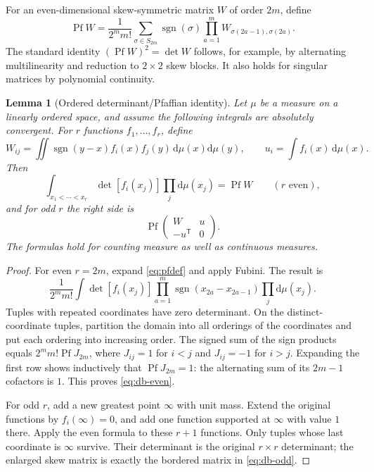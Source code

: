 \documentclass[11pt]{article}
\numberwithin{equation}{section}
\newtheorem{lemma}[lemma]{Lemma}
\theoremstyle{definition}
\newcommand{\dd}{\mathrm{d}}
\newcommand{\Pf}{\operatorname{Pf}}
\newcommand{\sgn}{\operatorname{sgn}}
\begin{document}
For an even-dimensional skew-symmetric matrix $W$ of order $2m$, define
\begin{equation}\label{eq:pfdef}
 \Pf W=\frac1{2^m m!}\sum_{\sigma\in S_{2m}}\sgn(\sigma)
       \prod_{a=1}^{m}W_{\sigma(2a-1),\sigma(2a)}.
\end{equation}
The standard identity $(\Pf W)^2=\det W$ follows, for example, by alternating multilinearity and reduction to $2\times2$ skew blocks. It also holds for singular matrices by polynomial continuity.

\begin{lemma}[Ordered determinant/Pfaffian identity]\label{lem:debruijn}
Let $\mu$ be a measure on a linearly ordered space, and assume the following integrals are absolutely convergent. For $r$ functions $f_1,\ldots,f_r$, define
\[
 W_{ij}=\iint\sgn(y-x)f_i(x)f_j(y)\,\dd\mu(x)\dd\mu(y),
 \qquad u_i=\int f_i(x)\,\dd\mu(x).
\]
Then
\begin{equation}\label{eq:db-even}
 \int_{x_1<\cdots<x_r}\det[f_i(x_j)]\prod_j\dd\mu(x_j)
 =\Pf W\qquad(r\text{ even}),
\end{equation}
and for odd $r$ the right side is
\begin{equation}\label{eq:db-odd}
 \Pf\begin{pmatrix}W&u\\-u^{\mathsf T}&0\end{pmatrix}.
\end{equation}
The formulas hold for counting measure as well as continuous measures.
\end{lemma}

\begin{proof}
For even $r=2m$, expand \eqref{eq:pfdef} and apply Fubini. The result is
\[
 \frac1{2^m m!}\int\det[f_i(x_j)]
 \prod_{a=1}^m\sgn(x_{2a}-x_{2a-1})\prod_j\dd\mu(x_j).
\]
Tuples with repeated coordinates have zero determinant. On the distinct-coordinate tuples, partition the domain into all orderings of the coordinates and put each ordering into increasing order. The signed sum of the sign products equals $2^m m!\Pf J_{2m}$, where $J_{ij}=1$ for $i<j$ and $J_{ij}=-1$ for $i>j$. Expanding the first row shows inductively that $\Pf J_{2m}=1$: the alternating sum of its $2m-1$ cofactors is $1$. This proves \eqref{eq:db-even}.

For odd $r$, add a new greatest point $\infty$ with unit mass. Extend the original functions by $f_i(\infty)=0$, and add one function supported at $\infty$ with value $1$ there. Apply the even formula to these $r+1$ functions. Only tuples whose last coordinate is $\infty$ survive. Their determinant is the original $r\times r$ determinant; the enlarged skew matrix is exactly the bordered matrix in \eqref{eq:db-odd}.
\end{proof}
\end{document}
